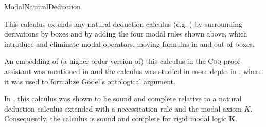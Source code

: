 \begin{entry}{ModalNaturalDeduction}
\begin{clarifications}
This calculus extends any natural deduction calculus (e.g. ) by surrounding derivations by boxes and by adding the four modal rules shown above, which introduce and eliminate modal operators, moving formulas in and out of boxes. 
\end{clarifications}

\begin{history}
An embedding of (a higher-order version of) this calculus in the \textsc{Coq} proof assistant was mentioned in \cite{CSR} and the calculus was studied in more depth in \cite{StudiaLogica}, where it was used to formalize G\"odel's ontological argument.
\end{history}

\begin{technicalities}
In \cite{StudiaLogica}, this calculus was shown to be sound and complete relative to a natural deduction calculus extended with a necessitation rule and the modal axiom $K$. Consequently, the calculus is sound and complete for rigid modal logic \textbf{K}.
\end{technicalities}


\end{entry}
